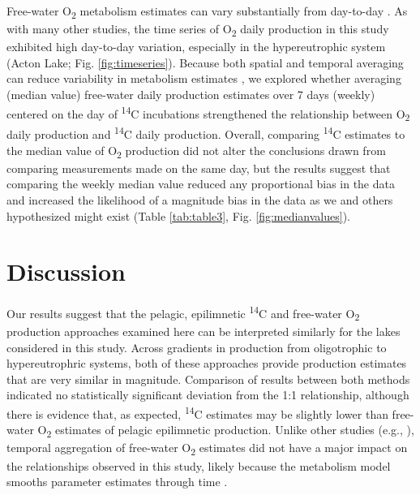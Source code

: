 \documentclass[12pt, oneside]{article}
\begin{document}
Free-water O\textsubscript{2} metabolism estimates can vary substantially from day-to-day \citep{Staehr_Sand-Jensen_2007, staehr_lake_2010, Coloso_Cole_Pace_2011, VandeBogert_Bade_Carpenter_Cole_Pace_Hanson_Langman_2012, solomon_ecosystem_2013}. As with many other studies, the time series of O\textsubscript{2} daily production in this study exhibited high day-to-day variation, especially in the hypereutrophic system (Acton Lake; Fig. \ref{fig:timeseries}). Because both spatial and temporal averaging can reduce variability in metabolism estimates \citep{staehr_lake_2010, VandeBogert_Bade_Carpenter_Cole_Pace_Hanson_Langman_2012, Richardson_Carey_Bruesewitz_Weathers_2017, Zwart_Sebestyen_Solomon_Jones_2017}, we explored whether averaging (median value) free-water daily production estimates over 7 days (weekly) centered on the day of \textsuperscript{14}C incubations strengthened the relationship between O\textsubscript{2} daily production and \textsuperscript{14}C daily production. Overall, comparing \textsuperscript{14}C estimates to the median value of O\textsubscript{2} production did not alter the conclusions drawn from comparing measurements made on the same day, but the results suggest that comparing the weekly median value reduced any proportional bias in the data and increased the likelihood of a magnitude bias in the data as we and others hypothesized might exist (Table \ref{tab:table3}, Fig. \ref{fig:medianvalues}).

\section*{Discussion}

Our results suggest that the pelagic, epilimnetic \textsuperscript{14}C and free-water O\textsubscript{2} production approaches examined here can be interpreted similarly for the lakes considered in this study. Across gradients in production from oligotrophic to hypereutrophric systems, both of these approaches provide production estimates that are very similar in magnitude. Comparison of results between both methods indicated no statistically significant deviation from the 1:1 relationship, although there is evidence that, as expected, \textsuperscript{14}C estimates may be slightly lower than free-water O\textsubscript{2} estimates of pelagic epilimnetic production. Unlike other studies (e.g., \citealt{staehr_lake_2010}), temporal aggregation of free-water O\textsubscript{2} estimates did not have a major impact on the relationships observed in this study, likely because the metabolism model smooths parameter estimates through time \citep{phillips_timevarying_2020}.
\end{document}
